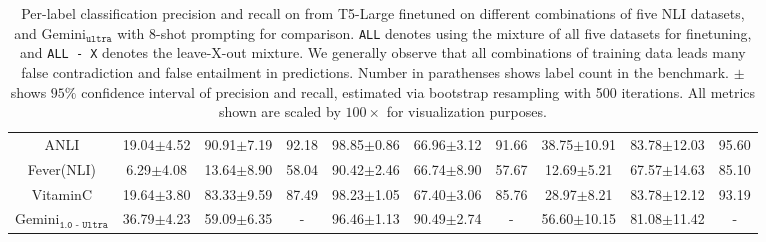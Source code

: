 \begin{table*}[t]
{\begin{tabular}{|c|ccc|ccc|ccc|}
ANLI & 19.04\scriptsize{$\pm$4.52} & 90.91\scriptsize{$\pm$7.19} & 92.18 & 98.85\scriptsize{$\pm$0.86} & 66.96\scriptsize{$\pm$3.12} & 91.66 & 38.75\scriptsize{$\pm$10.91} & 83.78\scriptsize{$\pm$12.03} & 95.60\\
Fever(NLI) & 6.29\scriptsize{$\pm$4.08} & 13.64\scriptsize{$\pm$8.90} & 58.04 & 90.42\scriptsize{$\pm$2.46} & 66.74\scriptsize{$\pm$8.90} & 57.67 & 12.69\scriptsize{$\pm$5.21} & 67.57\scriptsize{$\pm$14.63} & 85.10 \\
VitaminC & 19.64\scriptsize{$\pm$3.80} & 83.33\scriptsize{$\pm$9.59} & 87.49 & 98.23\scriptsize{$\pm$1.05} & 67.40\scriptsize{$\pm$3.06} & 85.76& 28.97\scriptsize{$\pm$8.21} & 83.78\scriptsize{$\pm$12.12} & 93.19 \\
\midrule
Gemini$_{\texttt{1.0 - Ultra}}$ & 36.79\scriptsize{$\pm$4.23} & 59.09\scriptsize{$\pm$6.35} & - & 96.46\scriptsize{$\pm$1.13} & 90.49\scriptsize{$\pm$2.74} & - & 56.60\scriptsize{$\pm$10.15} & 81.08\scriptsize{$\pm$11.42} & - \\
\bottomrule

\end{tabular}
}
\vspace{-0.07in}
\caption{
     Per-label classification  precision and recall on \datasetname from T5-Large finetuned on different combinations of five NLI datasets, and Gemini$_{\texttt{ultra}}$ with 8-shot prompting for comparison. \texttt{ALL} denotes using the mixture of all five datasets for finetuning, and \texttt{ALL - X} denotes the leave-X-out mixture. We generally observe that all combinations of training data leads many false contradiction and false entailment in predictions. Number in parathenses shows label count in the benchmark. $\pm$ shows $95\%$ confidence interval of precision and recall, estimated via bootstrap resampling with 500 iterations.  All metrics shown are scaled by $100\times$ for visualization purposes. }
\label{tab:refnli}
\end{table*}